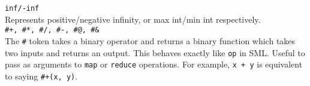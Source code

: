 \verb|inf/-inf|\\

Represents positive/negative infinity, or max int/min int respectively.\\

\verb|#+, #*, #/, #-, #@, #&|\\

The \verb|#| token takes a binary operator and returns a binary function which takes two inputs and returns an output. This behaves exactly like \verb|op| in SML. Useful to pass as arguments to \verb|map| or \verb|reduce| operations. For example, \verb|x + y| is equivalent to saying \verb|#+(x, y)|.
